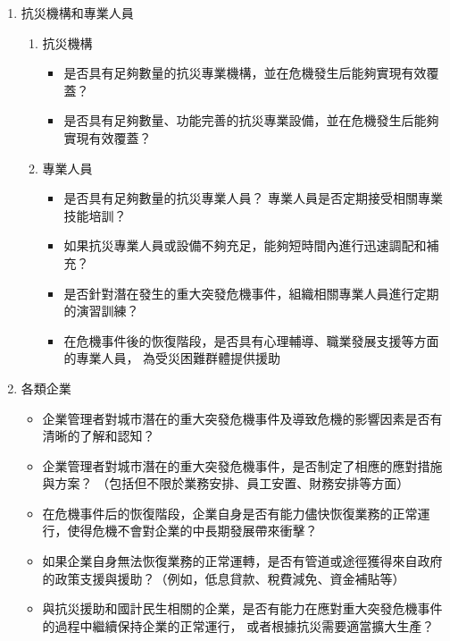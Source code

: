 \documentclass[a4paper,12pt]{article}
\begin{document}
\begin{enumerate}
\begin{enumerate}
\begin{enumerate}
\begin{itemize}
\end{itemize}
\end{enumerate}
\item 抗災機構和專業人員
\label{sec:org2a22d1b}
\begin{enumerate}
\item 抗災機構
\label{sec:orgf1b09ad}
\begin{itemize}
\item 是否具有足夠數量的抗災專業機構，並在危機發生后能夠實現有效覆蓋？\\
\item 是否具有足夠數量、功能完善的抗災專業設備，並在危機發生后能夠實現有效覆蓋？\\
\end{itemize}
\item 專業人員
\label{sec:org22bd422}
\begin{itemize}
\item 是否具有足夠數量的抗災專業人員？ 專業人員是否定期接受相關專業技能培訓？\\
\item 如果抗災專業人員或設備不夠充足，能夠短時間內進行迅速調配和補充？\\
\item 是否針對潛在發生的重大突發危機事件，組織相關專業人員進行定期的演習訓練？\\
\item 在危機事件後的恢復階段，是否具有心理輔導、職業發展支援等方面的專業人員， 為受災困難群體提供援助\\
\end{itemize}
\end{enumerate}
\item 各類企業
\label{sec:org29b63e2}
\begin{itemize}
\item 企業管理者對城市潛在的重大突發危機事件及導致危機的影響因素是否有清晰的了解和認知？\\
\item 企業管理者對城市潛在的重大突發危機事件，是否制定了相應的應對措施與方案？ （包括但不限於業務安排、員工安置、財務安排等方面）\\
\item 在危機事件后的恢復階段，企業自身是否有能力儘快恢復業務的正常運行，使得危機不會對企業的中長期發展帶來衝擊？\\
\item 如果企業自身無法恢復業務的正常運轉，是否有管道或途徑獲得來自政府的政策支援與援助？（例如，低息貸款、稅費減免、資金補貼等）\\
\item 與抗災援助和國計民生相關的企業，是否有能力在應對重大突發危機事件的過程中繼續保持企業的正常運行， 或者根據抗災需要適當擴大生產？\\

\end{itemize}
\end{enumerate}
\end{enumerate}
\end{document}
